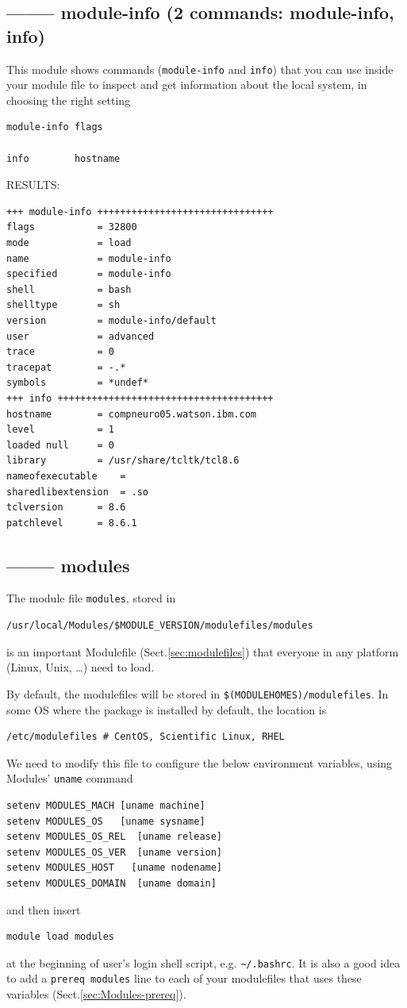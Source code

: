 \subsection{-------- module-info (2 commands: module-info, info)}

This module shows commands (\verb!module-info! and \verb!info!) that you can use
inside your module file to inspect and get information about the local system,
in choosing the right setting

\begin{verbatim}
module-info flags

info        hostname
\end{verbatim}

RESULTS:
\begin{verbatim}
+++ module-info +++++++++++++++++++++++++++++++
flags			= 32800
mode			= load
name			= module-info
specified		= module-info
shell			= bash
shelltype		= sh
version			= module-info/default
user			= advanced
trace			= 0
tracepat		= -.*
symbols			= *undef*
+++ info ++++++++++++++++++++++++++++++++++++++
hostname		= compneuro05.watson.ibm.com
level			= 1
loaded null		= 0
library			= /usr/share/tcltk/tcl8.6
nameofexecutable	=
sharedlibextension	= .so
tclversion		= 8.6
patchlevel		= 8.6.1
\end{verbatim}

\subsection{-------- modules}
\label{sec:Modules-modules}

The module file \verb!modules!, stored in 
\begin{verbatim}
/usr/local/Modules/$MODULE_VERSION/modulefiles/modules
\end{verbatim}
is an important Modulefile (Sect.\ref{sec:modulefiles})
that everyone in any platform (Linux, Unix, \ldots) need to load.

\begin{mdframed}
By default, the modulefiles will be stored in \verb!$(MODULEHOMES)/modulefiles!.
In some OS where the package is installed by default, the location is
\begin{verbatim}
/etc/modulefiles # CentOS, Scientific Linux, RHEL
\end{verbatim}
\end{mdframed}

We need to modify this file to configure the below environment variables, using
Modules' \verb!uname! command
\begin{verbatim}
setenv MODULES_MACH [uname machine]          
setenv MODULES_OS   [uname sysname] 
setenv MODULES_OS_REL  [uname release]
setenv MODULES_OS_VER  [uname version]
setenv MODULES_HOST   [uname nodename]
setenv MODULES_DOMAIN  [uname domain] 
\end{verbatim}
and then insert 
\begin{verbatim}
module load modules
\end{verbatim}
at the beginning of user's login shell script, e.g. \verb!~/.bashrc!.
It is also a good idea to add a \verb!prereq modules! line to 
each of your modulefiles that uses these variables
(Sect.\ref{sec:Modules-prereq}).


